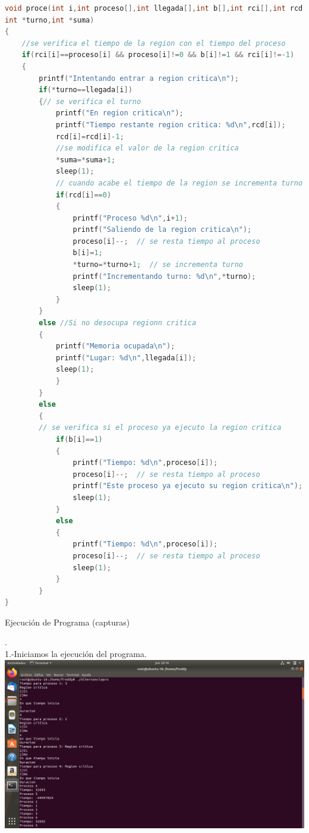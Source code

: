 \documentclass[11pt,a4paper]{report}
\begin{document}
\begin{lstlisting}[language=C++, caption={Alternancia}]
void proce(int i,int proceso[],int llegada[],int b[],int rci[],int rcd[],
int *turno,int *suma)
{
	//se verifica el tiempo de la region con el tiempo del proceso
	if(rci[i]==proceso[i] && proceso[i]!=0 && b[i]!=1 && rci[i]!=-1) 
	{
		printf("Intentando entrar a region critica\n");
		if(*turno==llegada[i])
		{// se verifica el turno
			printf("En region critica\n");
			printf("Tiempo restante region critica: %d\n",rcd[i]);  
			rcd[i]=rcd[i]-1;
			//se modifica el valor de la region critica
			*suma=*suma+1;   
			sleep(1);
			// cuando acabe el tiempo de la region se incrementa turno
			if(rcd[i]==0) 
			{
				printf("Proceso %d\n",i+1);
				printf("Saliendo de la region critica\n");
				proceso[i]--;  // se resta tiempo al proceso
				b[i]=1;
				*turno=*turno+1;  // se incrementa turno
				printf("Incrementando turno: %d\n",*turno);
				sleep(1);
			}
		}
		else //Si no desocupa regionn critica
		{
			printf("Memoria ocupada\n");
			printf("Lugar: %d\n",llegada[i]);
			sleep(1);
			}
		}
		else
		{
		// se verifica si el proceso ya ejecuto la region critica
			if(b[i]==1)  
			{
				printf("Tiempo: %d\n",proceso[i]);
				proceso[i]--;  // se resta tiempo al proceso
				printf("Este proceso ya ejecuto su region critica\n");
				sleep(1);
			}
			else
			{
				printf("Tiempo: %d\n",proceso[i]);
				proceso[i]--;  // se resta tiempo al proceso
				sleep(1);
			}
		}
}

\end{lstlisting}
\begin{center}
Ejecuci\'on de Programa (capturas)
\end{center}

. \\

1.-Iniciamos la ejecuci\'on del programa.\\
\includegraphics[scale=.35]{alternancia.png} 
\\
\\
\clearpage
\end{document}
